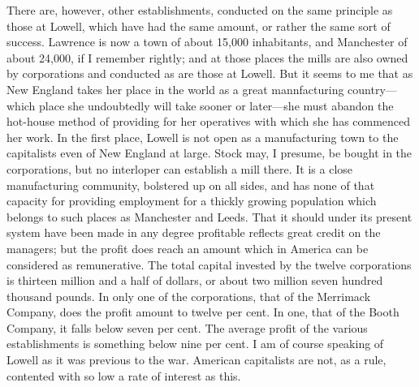 There are, however, other establishments, conducted on the same
principle as those at Lowell, which have had the same amount, or
rather the same sort of success.  Lawrence is now a town of about
15,000 inhabitants, and Manchester of about 24,000, if I remember
rightly; and at those places the mills are also owned by
corporations and conducted as are those at Lowell.  But it seems to
me that as New England takes her place in the world as a great
mannfacturing country---which place she undoubtedly will take sooner
or later---she must abandon the hot-house method of providing for
her operatives with which she has commenced her work.  In the first
place, Lowell is not open as a manufacturing town to the
capitalists even of New England at large.  Stock may, I presume, be
bought in the corporations, but no interloper can establish a mill
there.  It is a close manufacturing community, bolstered up on all
sides, and has none of that capacity for providing employment for a
thickly growing population which belongs to such places as
Manchester and Leeds.  That it should under its present system have
been made in any degree profitable reflects great credit on the
managers; but the profit does reach an amount which in America can
be considered as remunerative.  The total capital invested by the
twelve corporations is thirteen million and a half of dollars, or
about two million seven hundred thousand pounds.  In only one of
the corporations, that of the Merrimack Company, does the profit
amount to twelve per cent.  In one, that of the Booth Company, it
falls below seven per cent.  The average profit of the various
establishments is something below nine per cent.  I am of course
speaking of Lowell as it was previous to the war.  American
capitalists are not, as a rule, contented with so low a rate of
interest as this.

